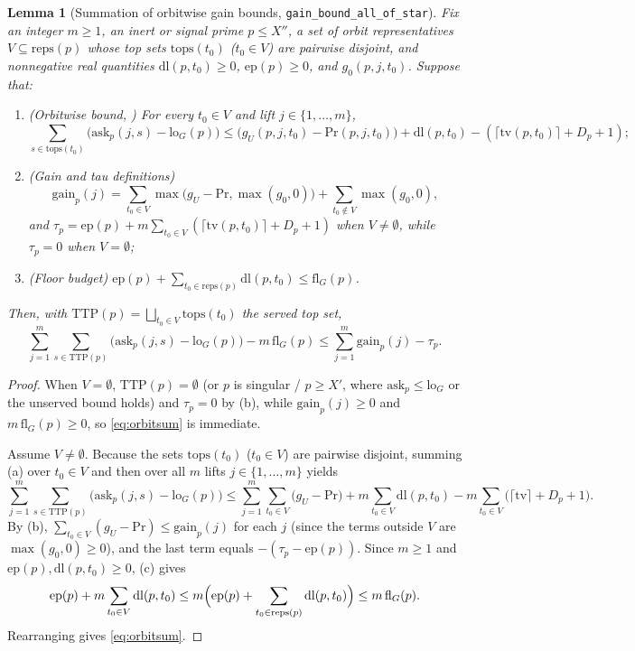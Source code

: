 \documentclass[11pt]{amsart}
\theoremstyle{plain}
\newtheorem{lemma}[theorem]{Lemma}
\theoremstyle{definition}
\numberwithin{equation}{section}
\begin{document}
\begin{lemma}[Summation of orbitwise gain bounds, \texttt{gain\_bound\_all\_of\_star}]\label{lem:orbitsum}
Fix an integer $m\ge1$, an inert or signal prime $p\le X''$, a set of orbit representatives
$V\subseteq\mathrm{reps}(p)$ whose top sets $\mathrm{tops}(t_0)$ ($t_0\in V$) are pairwise
disjoint, and nonnegative real quantities $\mathrm{dl}(p,t_0)\ge0$, $\mathrm{ep}(p)\ge0$, and
$g_0(p,j,t_0)$. Suppose that:
\begin{enumerate}[label=(\alph*)]
\item \textup{(Orbitwise bound, )} For every $t_0\in V$ and lift $j\in\{1,\dots,m\}$,
  \[
  \sum_{s\in\mathrm{tops}(t_0)}\bigl(\mathrm{ask}_p(j,s)-\mathrm{lo}_G(p)\bigr)\le
  \bigl(g_U(p,j,t_0)-\mathrm{Pr}(p,j,t_0)\bigr)+\mathrm{dl}(p,t_0)-(\lceil\mathrm{tv}(p,t_0)\rceil+D_p+1);
  \]
\item \textup{(Gain and tau definitions)}
  \[
  \mathrm{gain}_p(j)=\sum_{t_0\in V}\max\bigl(g_U-\mathrm{Pr},\max(g_0,0)\bigr)+\sum_{t_0\notin V}\max(g_0,0),
  \]
  and $\tau_p=\mathrm{ep}(p)+m\sum_{t_0\in V}(\lceil\mathrm{tv}(p,t_0)\rceil+D_p+1)$ when
  $V\neq\emptyset$, while $\tau_p=0$ when $V=\emptyset$;
\item \textup{(Floor budget)} $\mathrm{ep}(p)+\sum_{t_0\in\mathrm{reps}(p)}\mathrm{dl}(p,t_0)\le\mathrm{fl}_G(p)$.
\end{enumerate}
Then, with $\mathrm{TTP}(p)=\bigsqcup_{t_0\in V}\mathrm{tops}(t_0)$ the served top set,
\begin{equation}\label{eq:orbitsum}
\sum_{j=1}^m\sum_{s\in\mathrm{TTP}(p)}\bigl(\mathrm{ask}_p(j,s)-\mathrm{lo}_G(p)\bigr)
-m\,\mathrm{fl}_G(p)\le\sum_{j=1}^m\mathrm{gain}_p(j)-\tau_p.
\end{equation}
\end{lemma}

\begin{proof}
When $V=\emptyset$, $\mathrm{TTP}(p)=\emptyset$ (or $p$ is singular / $p\ge X'$, where
$\mathrm{ask}_p\le\mathrm{lo}_G$ or the unserved bound holds) and $\tau_p=0$ by (b), while
$\mathrm{gain}_p(j)\ge0$ and $m\,\mathrm{fl}_G(p)\ge0$, so \eqref{eq:orbitsum} is immediate.

Assume $V\neq\emptyset$. Because the sets $\mathrm{tops}(t_0)$ ($t_0\in V$) are pairwise disjoint,
summing (a) over $t_0\in V$ and then over all $m$ lifts $j\in\{1,\dots,m\}$ yields
\[
\sum_{j=1}^m\sum_{s\in\mathrm{TTP}(p)}\bigl(\mathrm{ask}_p(j,s)-\mathrm{lo}_G(p)\bigr)
\le \sum_{j=1}^m\sum_{t_0\in V}\bigl(g_U-\mathrm{Pr}\bigr)
+m\sum_{t_0\in V}\mathrm{dl}(p,t_0)-m\sum_{t_0\in V}\bigl(\lceil\mathrm{tv}\rceil+D_p+1\bigr).
\]
By (b), $\sum_{t_0\in V}(g_U-\mathrm{Pr})\le\mathrm{gain}_p(j)$ for each $j$ (since the terms
outside $V$ are $\max(g_0,0)\ge0$), and the last term equals $-(\tau_p-\mathrm{ep}(p))$. Since
$m\ge1$ and $\mathrm{ep}(p),\mathrm{dl}(p,t_0)\ge0$, (c) gives
\[
\mathrm{ep}(p)+m\sum_{t_0\in V}\mathrm{dl}(p,t_0)
\le m\Bigl(\mathrm{ep}(p)+\sum_{t_0\in\mathrm{reps}(p)}\mathrm{dl}(p,t_0)\Bigr)\le m\,\mathrm{fl}_G(p).
\]
Rearranging gives \eqref{eq:orbitsum}.
\end{proof}
\end{document}
